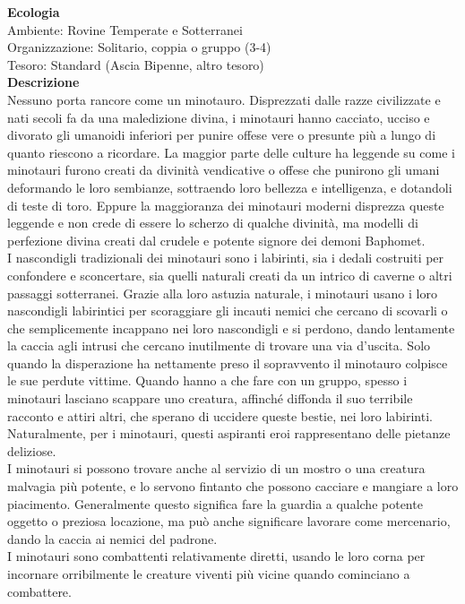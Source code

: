 \begin{multicols}{2}
\textbf{Ecologia}\\
Ambiente: Rovine Temperate e Sotterranei\\
Organizzazione: Solitario, coppia o gruppo (3-4)\\
Tesoro: Standard (Ascia Bipenne, altro tesoro)\\
\textbf{Descrizione}\\
Nessuno porta rancore come un minotauro. Disprezzati dalle razze civilizzate e nati secoli fa da una maledizione divina, i minotauri hanno cacciato, ucciso e divorato gli umanoidi inferiori per punire offese vere o presunte più a lungo di quanto riescono a ricordare. La maggior parte delle culture ha leggende su come i minotauri furono creati da divinità vendicative o offese che punirono gli umani deformando le loro sembianze, sottraendo loro bellezza e intelligenza, e dotandoli di teste di toro. Eppure la maggioranza dei minotauri moderni disprezza queste leggende e non crede di essere lo scherzo di qualche divinità, ma modelli di perfezione divina creati dal crudele e potente signore dei demoni Baphomet.\\
I nascondigli tradizionali dei minotauri sono i labirinti, sia i dedali costruiti per confondere e sconcertare, sia quelli naturali creati da un intrico di caverne o altri passaggi sotterranei. Grazie alla loro astuzia naturale, i minotauri usano i loro nascondigli labirintici per scoraggiare gli incauti nemici che cercano di scovarli o che semplicemente incappano nei loro nascondigli e si perdono, dando lentamente la caccia agli intrusi che cercano inutilmente di trovare una via d'uscita. Solo quando la disperazione ha nettamente preso il sopravvento il minotauro colpisce le sue perdute vittime. Quando hanno a che fare con un gruppo, spesso i minotauri lasciano scappare uno creatura, affinché diffonda il suo terribile racconto e attiri altri, che sperano di uccidere queste bestie, nei loro labirinti. Naturalmente, per i minotauri, questi aspiranti eroi rappresentano delle pietanze deliziose.\\
I minotauri si possono trovare anche al servizio di un mostro o una creatura malvagia più potente, e lo servono fintanto che possono cacciare e mangiare a loro piacimento. Generalmente questo significa fare la guardia a qualche potente oggetto o preziosa locazione, ma può anche significare lavorare come mercenario, dando la caccia ai nemici del padrone.\\
I minotauri sono combattenti relativamente diretti, usando le loro corna per incornare orribilmente le creature viventi più vicine quando cominciano a combattere.\\



\end{multicols}
